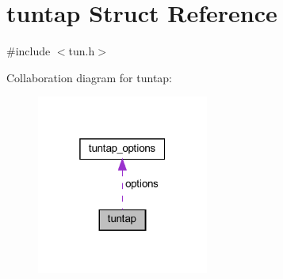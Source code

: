 \hypertarget{structtuntap}{}\section{tuntap Struct Reference}
\label{structtuntap}


{\ttfamily \#include $<$tun.\+h$>$}



Collaboration diagram for tuntap\+:
\nopagebreak
\begin{figure}[H]
\begin{center}
\leavevmode
\includegraphics[width=160pt]{structtuntap__coll__graph}
\end{center}
\end{figure}
